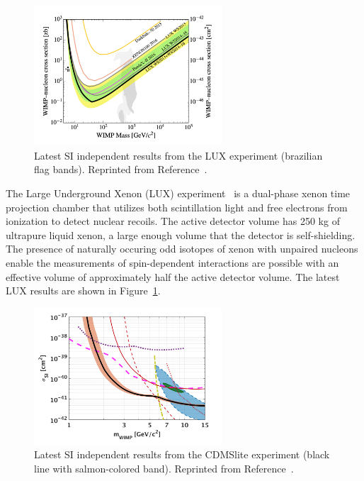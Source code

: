 \begin{figure}[htbp]
  \centering
  \includegraphics[width=0.625\textwidth]{DarkMatter/Figures/lux.png}
  \caption{
    Latest SI independent results from the LUX experiment (brazilian flag bands).
    Reprinted from Reference~\cite{LUX2017}. 
  }
  \label{fig:dm_lux}
\end{figure}

The Large Underground Xenon (LUX) experiment~\cite{LUX2017} is a  dual-phase xenon time projection chamber that utilizes both scintillation light and free electrons from ionization to detect nuclear recoils.
The active detector volume has 250 kg of ultrapure liquid xenon, a large enough volume that the detector is self-shielding.
The presence of naturally occuring odd isotopes of xenon with unpaired nucleons enable the measurements of spin-dependent interactions are possible with an effective volume of approximately half the active detector volume.
The latest LUX results are shown in Figure~\ref{fig:dm_lux}.

\begin{figure}[htbp]
  \centering
  \includegraphics[width=0.625\textwidth]{DarkMatter/Figures/cdms.png}
  \caption{
    Latest SI independent results from the CDMSlite experiment (black line with salmon-colored band).
    Reprinted from Reference~\cite{CDMS2016}.
  }
  \label{fig:dm_cdms}
\end{figure}

